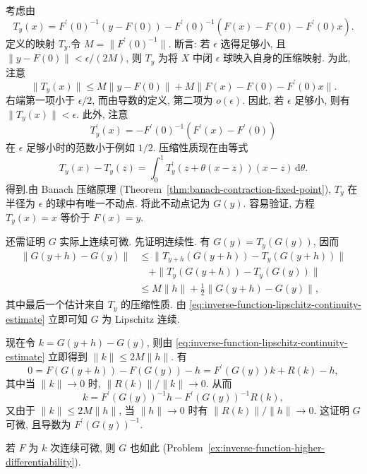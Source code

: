 \begin{Proof}
考虑由
\begin{equation}\label{eq:inverse-function-contraction-map-definition}
T_y(x)=F^{\prime}(0)^{-1}(y-F(0))-F^{\prime}(0)^{-1}(F(x)-F(0)-F^{\prime}(0)x).
\end{equation}
定义的映射 $T_y$.令 $M=\|F^{\prime}(0)^{-1}\|$. 断言: 若 $\epsilon$ 选得足够小, 且 $\|y-F(0)\|<\epsilon/(2M)$, 则 $T_y$ 为将 $X$ 中闭 $\epsilon$ 球映入自身的压缩映射. 为此, 注意
\begin{equation}\label{eq:inverse-function-contraction-ball-invariance-bound}
\|T_y(x)\|\leq M\|y-F(0)\|+M\|F(x)-F(0)-F^{\prime}(0)x\|.
\end{equation}
右端第一项小于 $\epsilon/2$, 而由导数的定义, 第二项为 $o(\epsilon)$. 因此, 若 $\epsilon$ 足够小, 则有 $\|T_y(x)\|<\epsilon$. 此外, 注意
\begin{equation}\label{eq:inverse-function-contraction-map-derivative}
T_y^{\prime}(x)=-F^{\prime}(0)^{-1}(F^{\prime}(x)-F^{\prime}(0))
\end{equation}
在 $\epsilon$ 足够小时的范数小于例如 $1/2$. 压缩性质现在由等式
\begin{equation}\label{eq:inverse-function-contraction-integrated-derivative}
T_y(x)-T_y(z)=\int_0^1T_y^{\prime}(z+\theta(x-z))(x-z)\,\mathrm{d}\theta.
\end{equation}
得到.由 Banach 压缩原理 (Theorem~\ref{thm:banach-contraction-fixed-point}), $T_y$ 在半径为 $\epsilon$ 的球中有唯一不动点. 将此不动点记为 $G(y)$. 容易验证, 方程 $T_y(x)=x$ 等价于 $F(x)=y$.

还需证明 $G$ 实际上连续可微. 先证明连续性. 有 $G(y)=T_y(G(y))$, 因而
\begin{equation}\label{eq:inverse-function-lipschitz-continuity-estimate}
\begin{aligned}
\|G(y+h)-G(y)\|&\leq\|T_{y+h}(G(y+h))-T_y(G(y+h))\|\\
&\quad+\|T_y(G(y+h))-T_y(G(y))\|\\
&\leq M\|h\|+\frac{1}{2}\|G(y+h)-G(y)\|,
\end{aligned}
\end{equation}
其中最后一个估计来自 $T_y$ 的压缩性质. 由 \eqref{eq:inverse-function-lipschitz-continuity-estimate} 立即可知 $G$ 为 Lipschitz 连续.

现在令 $k=G(y+h)-G(y)$, 则由 \eqref{eq:inverse-function-lipschitz-continuity-estimate} 立即得到 $\|k\|\leq2M\|h\|$. 有
\begin{equation}\label{eq:inverse-function-differentiability-remainder-expansion}
0=F(G(y+h))-F(G(y))-h=F^{\prime}(G(y))k+R(k)-h,
\end{equation}
其中当 $\|k\|\to0$ 时, $\|R(k)\|/\|k\|\to0$. 从而
\begin{equation}\label{eq:inverse-function-increment-linearization}
k=F^{\prime}(G(y))^{-1}h-F^{\prime}(G(y))^{-1}R(k),
\end{equation}
又由于 $\|k\|\leq2M\|h\|$, 当 $\|h\|\to0$ 时有 $\|R(k)\|/\|h\|\to0$. 这证明 $G$ 可微, 且导数为 $F^{\prime}(G(y))^{-1}$.
\end{Proof}
\endgroup

\begin{Remark}
\label{rem:inverse-function-higher-differentiability}
若 $F$ 为 $k$ 次连续可微, 则 $G$ 也如此 (Problem~\ref{ex:inverse-function-higher-differentiability}).
\end{Remark}
